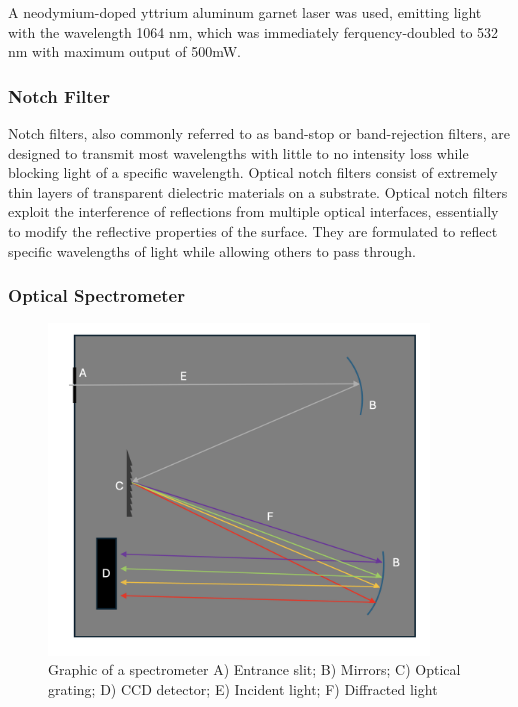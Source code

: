 \bigskip

A neodymium-doped yttrium aluminum garnet laser was used, emitting light with the wavelength 1064 nm, which was immediately ferquency-doubled to 532 nm with maximum output of 500mW.

\subsubsection{Notch Filter}
Notch filters, also commonly referred to as band-stop or band-rejection filters, are designed to transmit most wavelengths with little to no intensity loss while blocking light of a specific wavelength. Optical notch filters consist of extremely thin layers of transparent dielectric materials on a substrate. Optical notch filters exploit the interference of reflections from multiple optical interfaces, essentially to modify the reflective properties of the surface. They are formulated to reflect specific wavelengths of light while allowing others to pass through.

\subsubsection{Optical Spectrometer}


\begin{figure}[ht]
    \centering
    \includegraphics[width=0.9\textwidth]{images/setup_graphics/spectrometer.png}
    \caption{Graphic of a spectrometer A) Entrance slit; B) Mirrors; C) Optical grating; D) CCD detector; E) Incident light; F) Diffracted light}
    \label{fig:spectrometer}
\end{figure}

